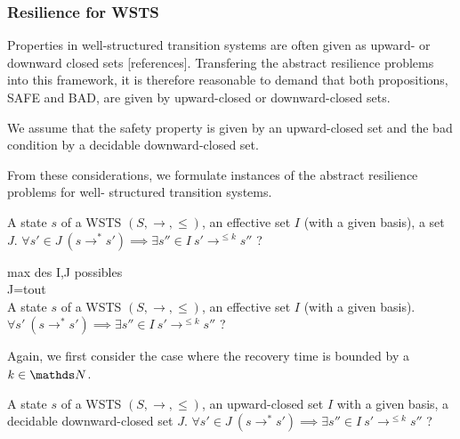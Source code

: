 \subsubsection{Resilience for WSTS}


Properties in well-structured transition systems are often given as upward- or downward closed sets [references].
Transfering the abstract resilience problems into this framework,
it is therefore reasonable to demand that both propositions, SAFE and BAD, are given by 
upward-closed or 
downward-closed sets.

We assume that the safety property is given by an upward-closed set and the bad condition by a decidable downward-closed set.


From these considerations, we formulate instances of the abstract resilience problems for well-
structured transition systems.


{A state $s$ of a WSTS $(S,\rightarrow, \leq)$, an effective set $I$ (with a given basis), a set $J$.}
{$\forall s' \in J ~ (s \rightarrow^* s') \implies \exists s'' \in I ~ s' \rightarrow^{\leq k} s''$ ?\newline}

max des I,J possibles \\

J=tout \\
{A state $s$ of a WSTS $(S,\rightarrow, \leq)$, an effective set $I$ (with a given basis).}
{$\forall s'  ~ (s \rightarrow^* s') \implies \exists s'' \in I ~ s' \rightarrow^{\leq k} s''$ ?\newline}

Again, we first consider the case where the recovery time is bounded by a $k \in \N$.

{A state $s$ of a WSTS $(S,\rightarrow, \leq)$, an upward-closed set $I$ with a given basis, a decidable downward-closed set $J$.}
{$\forall s' \in J ~ (s \rightarrow^* s') \implies \exists s'' \in I ~ s' \rightarrow^{\leq k} s''$ ?\newline}

